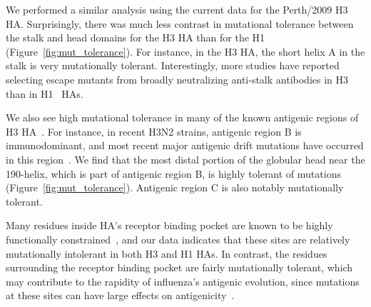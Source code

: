 \documentclass[9pt,twocolumn,twoside]{pnas-new}
\begin{document}
We performed a similar analysis using the current data for the Perth/2009 H3 HA.
Surprisingly, there was much less contrast in mutational tolerance between the stalk and head domains for the H3 HA than for the H1 (Figure~\ref{fig:mut_tolerance}).
For instance, in the H3 HA, the short helix A in the stalk is very mutationally tolerant.
Interestingly, more studies have reported selecting escape mutants from broadly neutralizing anti-stalk antibodies in H3~\cite{ekiert2011highly, friesen2014common, chai2016two, yamayoshi2017human} than in H1~\cite{okuno1993common,doud2017quantifying} HAs.

We also see high mutational tolerance in many of the known antigenic regions of H3 HA~\cite{wiley1981structural}.
For instance, in recent H3N2 strains, antigenic region B is immunodominant, and most recent major antigenic drift mutations have occurred in this region~\cite{chambers2015identification,koel2013substitutions,popova2012immunodominance}.
We find that the most distal portion of the globular head near the 190-helix, which is part of antigenic region B, is highly tolerant of mutations (Figure~\ref{fig:mut_tolerance}).
Antigenic region C is also notably mutationally tolerant.

Many residues inside HA's receptor binding pocket are known to be highly functionally constrained~\cite{wilson1981structure,martin1998studies}, and our data indicates that these sites are relatively mutationally intolerant in both H3 and H1 HAs.
In contrast, the residues surrounding the receptor binding pocket are fairly mutationally tolerant, which may contribute to the rapidity of influenza's antigenic evolution, since mutations at these sites can have large effects on antigenicity~\cite{wiley1981structural,koel2013substitutions}.
\end{document}
